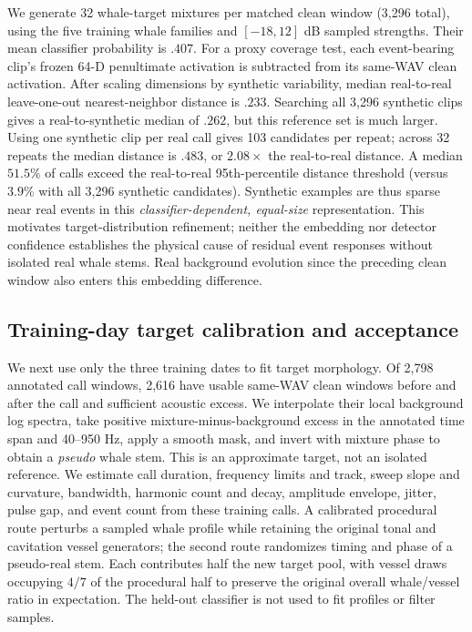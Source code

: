 \documentclass[conference]{IEEEtran}
\begin{document}
We generate 32 whale-target mixtures per matched clean window (3,296 total),
using the five training whale families and $[-18,12]$ dB sampled strengths.
Their mean classifier probability is $.407$. For a proxy coverage test, each
event-bearing clip's frozen 64-D penultimate activation is subtracted from
its same-WAV clean activation. After scaling dimensions by synthetic
variability, median real-to-real leave-one-out nearest-neighbor distance is
$.233$. Searching all 3,296 synthetic clips gives a real-to-synthetic median
of $.262$, but this reference set is much larger. Using one synthetic clip
per real call gives 103 candidates per repeat; across 32 repeats the median
distance is $.483$, or $2.08\times$ the real-to-real distance. A median
$51.5\%$ of calls exceed the real-to-real 95th-percentile distance threshold
(versus $3.9\%$ with all 3,296 synthetic candidates). Synthetic examples are
thus sparse near real events in this \emph{classifier-dependent, equal-size}
representation. This motivates target-distribution refinement; neither the
embedding nor detector confidence establishes the physical cause of residual
event responses without isolated real whale stems. Real background evolution
since the preceding clean window also enters this embedding difference.

\subsection{Training-day target calibration and acceptance}
We next use only the three training dates to fit target morphology. Of 2,798
annotated call windows, 2,616 have usable same-WAV clean windows before and
after the call and sufficient acoustic excess. We interpolate their local
background log spectra, take positive mixture-minus-background excess in the
annotated time span and 40--950 Hz, apply a smooth mask, and invert with mixture
phase to obtain a \emph{pseudo} whale stem. This is an approximate target,
not an isolated reference. We estimate call duration, frequency limits and
track, sweep slope and curvature, bandwidth, harmonic count and decay,
amplitude envelope, jitter, pulse gap, and event count from these training
calls. A calibrated procedural route perturbs a sampled whale profile while
retaining the original tonal and cavitation vessel generators;
the second route randomizes timing and phase of a pseudo-real stem. Each
contributes half the new target pool, with vessel draws occupying $4/7$ of
the procedural half to preserve the original overall whale/vessel ratio in expectation.
The held-out classifier is not used
to fit profiles or filter samples.
\end{document}
